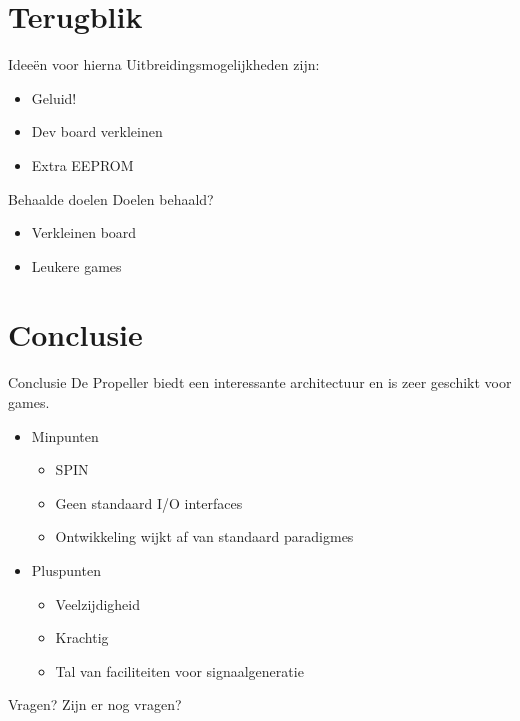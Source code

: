 \documentclass{beamer}
\begin{document}
\section{Terugblik}

\begin {frame}{Ideeën voor hierna}
	Uitbreidingsmogelijkheden zijn:
	\begin{itemize}
		\item
			Geluid!
			\pause
		\item
			Dev board verkleinen
			\pause
		\item
			Extra EEPROM
	\end{itemize}
\end{frame}

\begin{frame}{Behaalde doelen}
	Doelen behaald?
	\begin{itemize}
		\item
			Verkleinen board
			\pause
		\item
			Leukere games
	\end{itemize}
\end{frame}

\section{Conclusie}

\begin{frame}{Conclusie}
	De Propeller biedt een interessante architectuur en is zeer geschikt voor games.
	\begin{itemize}
		\item
			Minpunten
			\begin{itemize}
				\item SPIN
				\item Geen standaard I/O interfaces
				\item Ontwikkeling wijkt af van standaard paradigmes
			\end{itemize}
			\pause
		\item
			Pluspunten
			\begin{itemize}
				\item Veelzijdigheid
				\item Krachtig
				\item Tal van faciliteiten voor signaalgeneratie
			\end{itemize}
	\end{itemize}
\end{frame}

\begin{frame}{Vragen?}
	Zijn er nog vragen?
\end{frame}
\end{document}
